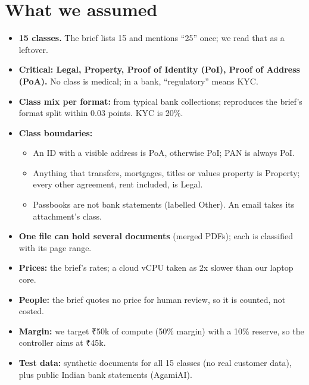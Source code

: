 \documentclass[9pt]{extarticle}
\newcommand\R{₹}
\begin{document}
\section{What we assumed}
\begin{itemize}
\item \textbf{15 classes.} The brief lists 15 and mentions ``25'' once; we read that as a leftover.
\item \textbf{Critical: Legal, Property, Proof of Identity (PoI), Proof of Address (PoA).} No class is medical; in a bank, ``regulatory'' means KYC.
\item \textbf{Class mix per format:} from typical bank collections; reproduces the brief's format split within 0.03 points. KYC is 20\%.
\item \textbf{Class boundaries:}
  \begin{itemize}
  \item An ID with a visible address is PoA, otherwise PoI; PAN is always PoI.
  \item Anything that transfers, mortgages, titles or values property is Property; every other agreement, rent included, is Legal.
  \item Passbooks are not bank statements (labelled Other). An email takes its attachment's class.
  \end{itemize}
\item \textbf{One file can hold several documents} (merged PDFs); each is classified with its page range.
\item \textbf{Prices:} the brief's rates; a cloud vCPU taken as 2x slower than our laptop core.
\item \textbf{People:} the brief quotes no price for human review, so it is counted, not costed.
\item \textbf{Margin:} we target \R50k of compute (50\% margin) with a 10\% reserve, so the controller aims at \R45k.
\item \textbf{Test data:} synthetic documents for all 15 classes (no real customer data), plus public Indian bank statements (AgamiAI).
\end{itemize}
\end{document}
